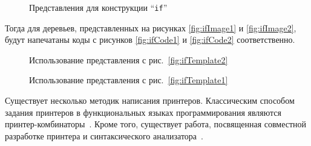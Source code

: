\begin{figure}[h!]
	\subfloat[]{
		
		\label{fig:ifTemplate2}	
	}
	\quad
	\subfloat[]{
		
		\label{fig:ifTemplate1}	
	}
	\caption{Представления для конструкции “\lstinline{if}”}
\end{figure}


Тогда для деревьев, представленных на рисунках
\ref{fig:ifImage1} и \ref{fig:ifImage2}, будут напечатаны коды с
рисунков \ref{fig:ifCode1} и \ref{fig:ifCode2} соответственно.

\begin{figure}[h!]
	\subfloat[]{
		\centering
		\texttt{[image: if1]}
		\label{fig:ifImage1}
	}
	\quad
	\subfloat[]{
		\centering
		
		\label{fig:ifCode1}	
	}

	\caption{Использование представления с рис.~\ref{fig:ifTemplate2}}
\end{figure}

\begin{figure}[h!]
	\subfloat[]{
		\centering
		\texttt{[image: if2]}
		\label{fig:ifImage2}
	}
	\quad
	\subfloat[]{
		\centering
		
		\label{fig:ifCode2}	
	}

	\caption{Использование представления с рис.~\ref{fig:ifTemplate1}}
\end{figure}

Существует несколько методик написания принтеров. 
Классическим способом задания принтеров в функциональных языках
программирования являются
принтер-комбинаторы~\cite{wadler, swierstra, swierstraChitil,
swierstra04, hughes, peytonJones, kiselyov, chitil, swiComb}.
Кроме того, существует работа, посвященная совместной разработке
принтера и синтаксического анализатора~\cite{rendelInvert}.



